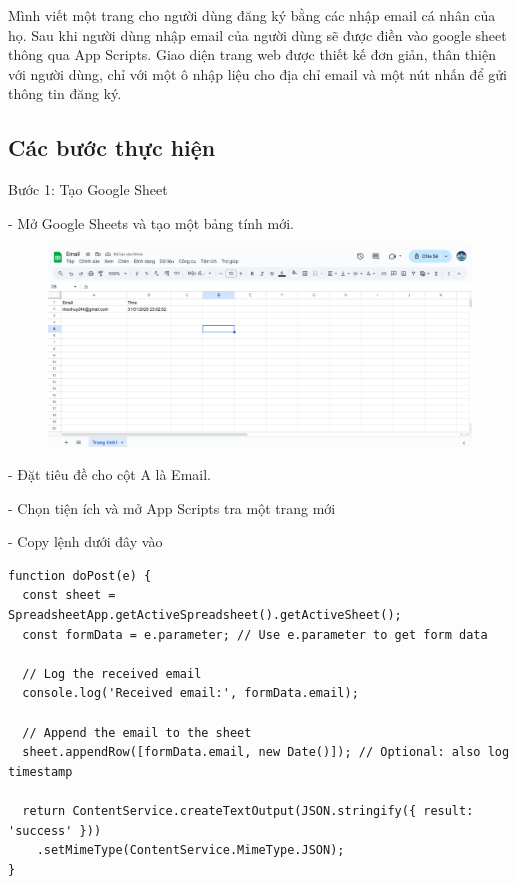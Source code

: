 Mình viết một trang cho người dùng đăng ký bằng các nhập email cá nhân của họ. Sau khi người dùng nhập email của người dùng sẽ được điền vào google sheet thông qua App Scripts. Giao diện trang web được thiết kế đơn giản, thân thiện với người dùng, chỉ với một ô nhập liệu cho địa chỉ email và một nút nhấn để gửi thông tin đăng ký.


\newpage

\subsection{Các bước thực hiện}

Bước 1: Tạo Google Sheet

- Mở Google Sheets và tạo một bảng tính mới.

\begin{figure}[htbp]
    \centering
    \includegraphics[width=1\linewidth]{Chap1-7/sheet_email.pdf}
\end{figure}

- Đặt tiêu đề cho cột A là Email.

- Chọn tiện ích và mở App Scripts tra một trang mới

- Copy lệnh dưới đây vào

\begin{verbatim}
function doPost(e) {
  const sheet = SpreadsheetApp.getActiveSpreadsheet().getActiveSheet();
  const formData = e.parameter; // Use e.parameter to get form data
  
  // Log the received email
  console.log('Received email:', formData.email);
  
  // Append the email to the sheet
  sheet.appendRow([formData.email, new Date()]); // Optional: also log timestamp
  
  return ContentService.createTextOutput(JSON.stringify({ result: 'success' }))
    .setMimeType(ContentService.MimeType.JSON);
}
\end{verbatim}


